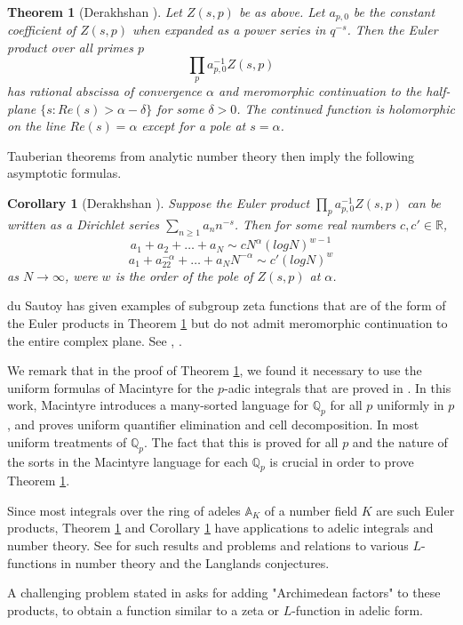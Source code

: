 \documentclass[12pt]{amsart}
\def\A{\mathbb{A}}
\def\R{\mathbb{R}}
\def\R{\mathbb{R}}
\def\Q{\mathbb{Q}}
\newtheorem{thm}{Theorem}[section]
\newtheorem{cor}{Corollary}[section]
\numberwithin{equation}{section}
\begin{document}
\begin{thm}[Derakhshan {\cite{zeta1}}]\label{Thm-zeta} Let $Z(s,p)$ be as above. 
Let $a_{p,0}$ be the constant coefficient of $Z(s,p)$ when expanded as a power series in $q^{-s}$. Then the Euler product over all primes $p$ 
$$\prod_p a_{p,0}^{-1} Z(s,p)$$
has rational abscissa of convergence $\alpha$ and meromorphic continuation to the half-plane $\{s: Re(s)>\alpha -\delta\}$ for some $\delta>0$.
The continued function is holomorphic on the line $Re(s)=\alpha$ except for a pole at $s=\alpha$.\end{thm}
Tauberian theorems from analytic number theory then imply the following asymptotic formulas.
\begin{cor}[Derakhshan {\cite{zeta1}}] \label{cor-zeta} 
Suppose the Euler product $\prod_p a_{p,0}^{-1} Z(s,p)$ can be written as a Dirichlet series $\sum_{n\geq 1} a_n n^{-s}$. Then for some real numbers $c,c'\in \R$, 
$$a_1+a_2+\dots+a_N \sim c N^{\alpha}(log N)^{w-1}$$ 
$$a_1+a_22^{-\alpha}+\dots + a_N N^{-\alpha} \sim c'(log N)^w$$
as $N \rightarrow \infty$, were $w$ is the order of the pole of $Z(s,p)$ at $\alpha$.\end{cor}

du Sautoy has given examples of subgroup zeta functions that are of the form of the Euler products 
in Theorem \ref{Thm-zeta} but do not admit meromorphic continuation to the entire complex plane. See \cite{ds-nat-bnd}, 
\cite{ds-book}.

We remark that in the proof of Theorem \ref{Thm-zeta}, we found it necessary to use the uniform formulas of 
Macintyre for the $p$-adic integrals that are proved in \cite{Macintyre2}. In this work, Macintyre introduces a many-sorted language for $\Q_p$ for all $p$ uniformly in $p$, and proves uniform quantifier elimination and cell decomposition. In most uniform treatments 
of $\Q_p$. The fact that this is proved for all $p$ and the nature of the sorts in the Macintyre language for each $\Q_p$ is crucial in order to prove Theorem \ref{Thm-zeta}.

Since most integrals over the ring of adeles $\A_K$ of a number field $K$ are such Euler products, 
Theorem \ref{Thm-zeta} and Corollary \ref{cor-zeta} have applications to adelic integrals and number theory. See \cite{adeles-surv} for such results and problems and relations to various $L$-functions in number theory and the Langlands conjectures.

A challenging problem stated in \cite{adeles-surv} asks for adding "Archimedean factors" to these products, to obtain a function similar to a zeta or $L$-function in adelic form.
\end{document}
